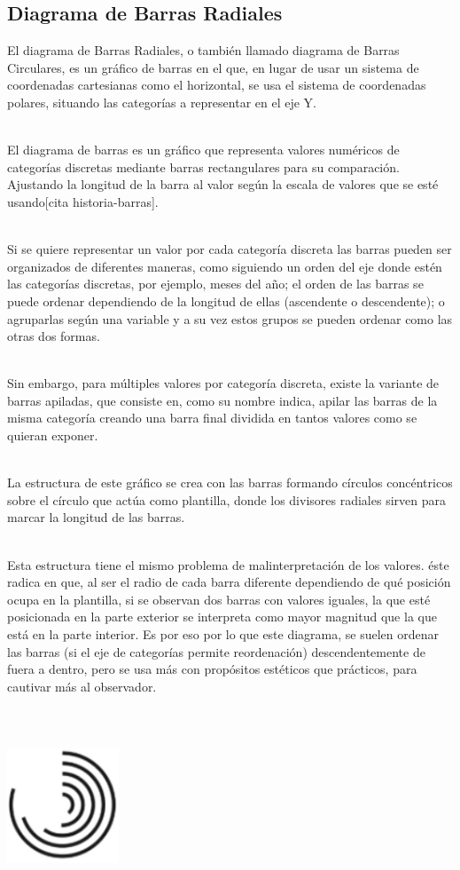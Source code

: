 \documentclass{article}\usepackage[]{graphicx}\usepackage[]{color}
\begin{document}
\subsection{Diagrama de Barras Radiales}\label{ssec:barras}
El diagrama de Barras Radiales, o tambi\'en llamado diagrama de Barras Circulares, es un gr\'afico de barras en el que, en lugar de usar un sistema de coordenadas cartesianas como el horizontal, se usa el sistema de coordenadas polares, situando las categor\'ias a representar en el eje Y.~\\~\par
El diagrama de barras es un gr\'afico que representa valores num\'ericos de categor\'ias discretas mediante barras rectangulares para su comparaci\'on. Ajustando la longitud de la barra al valor seg\'un la escala de valores que se est\'e usando[cita historia-barras].~\\~\par
Si se quiere representar un valor por cada categor\'ia discreta las barras pueden ser organizados de diferentes maneras, como siguiendo un orden del eje donde est\'en las categor\'ias discretas, por ejemplo, meses del a\~no; el orden de las barras se puede ordenar dependiendo de la longitud de ellas (ascendente o descendente); o agruparlas seg\'un una variable y a su vez estos grupos se pueden ordenar como las otras dos formas.~\\~\par
Sin embargo, para m\'ultiples valores por categor\'ia discreta, existe la variante de barras apiladas, que consiste en, como su nombre indica, apilar las barras de la misma categor\'ia creando una barra final dividida en tantos valores como se quieran exponer.~\\~\par
La estructura de este gr\'afico se crea con las barras formando c\'irculos conc\'entricos sobre el c\'irculo que act\'ua como plantilla, donde los divisores radiales sirven para marcar la longitud de las barras.~\\~\par
Esta estructura tiene el mismo problema de malinterpretaci\'on de los valores. \'este radica en que, al ser el radio de cada barra diferente dependiendo de qu\'e posici\'on ocupa en la plantilla, si se observan dos barras con valores iguales, la que est\'e posicionada en la parte exterior se interpreta como mayor magnitud que la que est\'a en la parte interior. Es por eso por lo que este diagrama, se suelen ordenar las barras (si el eje de categor\'ias permite reordenaci\'on) descendentemente de fuera a dentro, pero se usa m\'as con prop\'ositos est\'eticos que pr\'acticos, para cautivar m\'as al observador.
~\\~\\~\\~\\
\vbox{
    \centering
    \includegraphics[width=0.25\textwidth]{imag/barras_radiales}
}
\clearpage
\end{document}
